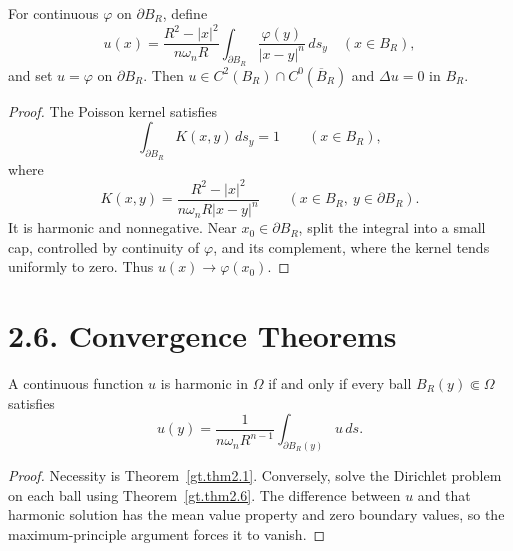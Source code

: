\begin{theorem}\label{gt.thm2.6}
For continuous $\varphi$ on $\partial B_R$, define
\begin{equation}
\tag{2.27}
u(x)=\frac{R^2-|x|^2}{n\omega_nR}
\int_{\partial B_R}\frac{\varphi(y)}{|x-y|^n}\,ds_y
\quad(x\in B_R),
\end{equation}
and set $u=\varphi$ on $\partial B_R$. Then
$u\in C^2(B_R)\cap C^0(\overline B_R)$ and $\Delta u=0$ in $B_R$.
\end{theorem}
\begin{proof}
\sketch The Poisson kernel satisfies
\begin{equation}
\tag{2.28}
\int_{\partial B_R}K(x,y)\,ds_y=1\qquad(x\in B_R),
\end{equation}
where
\begin{equation}
\tag{2.29}
K(x,y)=\frac{R^2-|x|^2}{n\omega_nR|x-y|^n}
\qquad(x\in B_R,\ y\in\partial B_R).
\end{equation}
It is harmonic and nonnegative. Near $x_0\in\partial B_R$, split the integral into a
small cap, controlled by continuity of $\varphi$, and its complement, where
the kernel tends uniformly to zero. Thus $u(x)\to\varphi(x_0)$.
\end{proof}

\section*{2.6. Convergence Theorems}

\begin{theorem}\label{gt.thm2.7}
A continuous function $u$ is harmonic in $\Omega$ if and only if every ball
$B_R(y)\Subset\Omega$ satisfies
\begin{equation}
\tag{2.30}
u(y)=\frac{1}{n\omega_nR^{n-1}}\int_{\partial B_R(y)}u\,ds.
\end{equation}
\end{theorem}
\begin{proof}
\sketch Necessity is Theorem~\ref{gt.thm2.1}. Conversely, solve the
Dirichlet problem on each ball using Theorem~\ref{gt.thm2.6}. The difference
between $u$ and that harmonic solution has the mean value property and zero
boundary values, so the maximum-principle argument forces it to vanish.
\end{proof}

